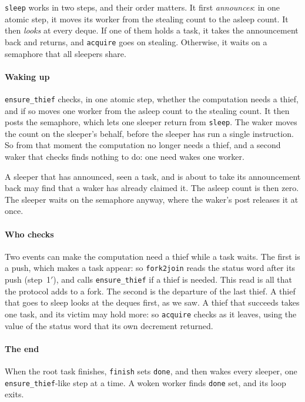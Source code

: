 \documentclass[sigplan,nonacm]{acmart}
\begin{document}
\lstinline|sleep| works in two steps, and their order matters.
%
It first \emph{announces}: in one atomic step, it moves its worker from
the stealing count to the asleep count.
%
It then \emph{looks} at every deque.
%
If one of them holds a task, it takes the announcement back and
returns, and \lstinline|acquire| goes on stealing.
%
Otherwise, it waits on a semaphore that all sleepers share.

\paragraph{Waking up}
%
\lstinline|ensure_thief| checks, in one atomic step, whether the
computation needs a thief, and if so moves one worker from the asleep
count to the stealing count.
%
It then posts the semaphore, which lets one sleeper return from
\lstinline|sleep|.
%
The waker moves the count on the sleeper's behalf, before the sleeper
has run a single instruction.
%
So from that moment the computation no longer needs a thief, and a
second waker that checks finds nothing to do: one need wakes one
worker.

A sleeper that has announced, seen a task, and is about to take its
announcement back may find that a waker has already claimed it.
%
The asleep count is then zero.
%
The sleeper waits on the semaphore anyway, where the waker's post
releases it at once.

\paragraph{Who checks}
%
Two events can make the computation need a thief while a task waits.
%
The first is a push, which makes a task appear: so
\lstinline|fork2join| reads the status word after its push
(step~1$'$), and calls \lstinline|ensure_thief| if a thief is needed.
%
This read is all that the protocol adds to a fork.
%
The second is the departure of the last thief.
%
A thief that goes to sleep looks at the deques first, as we saw.
%
A thief that succeeds takes one task, and its victim may hold more:
so \lstinline|acquire| checks as it leaves, using the value of the
status word that its own decrement returned.

\paragraph{The end}
%
When the root task finishes, \lstinline|finish| sets
\lstinline|done|, and then wakes every sleeper, one
\lstinline|ensure_thief|-like step at a time.
%
A woken worker finds \lstinline|done| set, and its loop exits.
\end{document}

